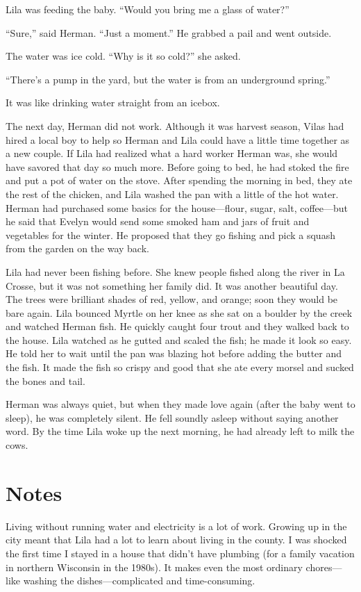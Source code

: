 \documentclass[
  american,
  letterpaper,
]{book}
\begin{document}
Lila was feeding the baby. ``Would you bring me a glass of water?''

``Sure,'' said Herman. ``Just a moment.'' He grabbed a pail and went
outside.

The water was ice cold. ``Why is it so cold?'' she asked.

``There's a pump in the yard, but the water is from an underground
spring.''

It was like drinking water straight from an icebox.

The next day, Herman did not work. Although it was harvest season, Vilas
had hired a local boy to help so Herman and Lila could have a little
time together as a new couple. If Lila had realized what a hard worker
Herman was, she would have savored that day so much more. Before going
to bed, he had stoked the fire and put a pot of water on the stove.
After spending the morning in bed, they ate the rest of the chicken, and
Lila washed the pan with a little of the hot water. Herman had purchased
some basics for the house---flour, sugar, salt, coffee---but he said
that Evelyn would send some smoked ham and jars of fruit and vegetables
for the winter. He proposed that they go fishing and pick a squash from
the garden on the way back.

Lila had never been fishing before. She knew people fished along the
river in La Crosse, but it was not something her family did. It was
another beautiful day. The trees were brilliant shades of red, yellow,
and orange; soon they would be bare again. Lila bounced Myrtle on her
knee as she sat on a boulder by the creek and watched Herman fish. He
quickly caught four trout and they walked back to the house. Lila
watched as he gutted and scaled the fish; he made it look so easy. He
told her to wait until the pan was blazing hot before adding the butter
and the fish. It made the fish so crispy and good that she ate every
morsel and sucked the bones and tail.

Herman was always quiet, but when they made love again (after the baby
went to sleep), he was completely silent. He fell soundly asleep without
saying another word. By the time Lila woke up the next morning, he had
already left to milk the cows.

\section{Notes}\label{notes-37}

Living without running water and electricity is a lot of work. Growing
up in the city meant that Lila had a lot to learn about living in the
county. I was shocked the first time I stayed in a house that didn't
have plumbing (for a family vacation in northern Wisconsin in the
1980s). It makes even the most ordinary chores---like washing the
dishes---complicated and time-consuming.
\end{document}
